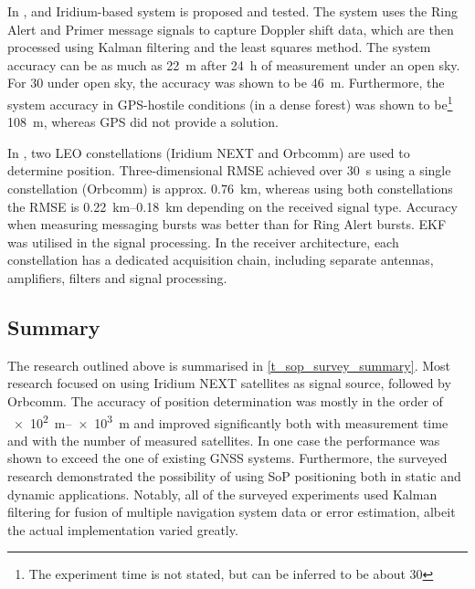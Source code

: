 In \cite{sop11}, and Iridium-based system is proposed and tested. The system uses the Ring Alert and Primer message signals to capture Doppler shift data, which are then processed using Kalman filtering and the least squares method. The system accuracy can be as much as \qty{22}{\m} after \qty{24}{\hour} of measurement under an open sky. For \qty{30}{\min} under open sky, the accuracy was shown to be \qty{46}{\m}. Furthermore, the system accuracy in GPS-hostile conditions (in a dense forest) was shown to be\footnote{The experiment time is not stated, but can be inferred to be about \qty{30}{\min}} \qty{108}{\m}, whereas GPS did not provide a solution.

In \cite{sop03}, two LEO constellations (Iridium NEXT and Orbcomm) are used to determine position. Three-dimensional RMSE achieved over \qty{30}{\s} using a single constellation (Orbcomm) is approx. \qty{0.76}{\km}, whereas using both constellations the RMSE is \qtyrange{0.22}{0.18}{\km} depending on the received signal type. Accuracy when measuring messaging bursts was better than for Ring Alert bursts. EKF was utilised in the signal processing. In the receiver architecture, each constellation has a dedicated acquisition chain, including separate antennas, amplifiers, filters and signal processing.


\subsection{Summary}
The research outlined above is summarised in \autoref{t_sop_survey_summary}. Most research focused on using Iridium NEXT satellites as signal source, followed by Orbcomm. The accuracy of position determination was mostly in the order of \qtyrange{e2}{e3}{\m} and improved significantly both with measurement time and with the number of measured satellites. In one case the performance was shown to exceed the one of existing GNSS systems. Furthermore, the surveyed research demonstrated the possibility of using SoP positioning both in static and dynamic applications. Notably, all of the surveyed experiments used Kalman filtering for fusion of multiple navigation system data or error estimation, albeit the actual implementation varied greatly.

